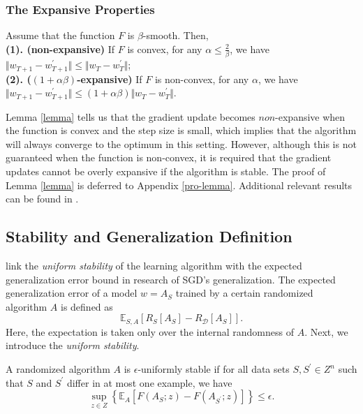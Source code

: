 \subsubsection{The Expansive Properties}
\begin{lemma}\label{lemma}
Assume that the function $F$ is $\beta$-smooth. Then, \\
{\bf (1). (non-expansive)} If $F$ is convex, for any $\alpha \leq \frac{2}{\beta}$, we have $\Vert w_{T+1}-w_{T+1}^{\prime} \Vert \leq \Vert w_{T}-w_{T}^{\prime}\Vert$; \\
{\bf (2). ($(1\!+\!\alpha\beta)$-expansive)} If $F$ is non-convex, for any $\alpha$, we have $\Vert w_{T+1}\!-\!w_{T+1}^{\prime} \Vert \!\leq\! (1\!+\!\alpha\beta)\Vert w_{T}\!-\!w_{T}^{\prime}\Vert$.
\end{lemma}

Lemma \ref{lemma} tells us that the gradient update becomes $non$-expansive when the function is convex and the step size is small, which implies that the algorithm will always converge to the optimum in this setting. However, although this is not guaranteed when the function is non-convex, it is required that the gradient updates cannot be overly expansive if the algorithm is stable. The proof of Lemma \ref{lemma} is deferred to Appendix \ref{pro-lemma}. Additional relevant results can be found in \citet{hardt2016train,xiao2022stability}. 

\subsection{Stability and Generalization Definition}
\citet{hardt2016train} link the \emph{uniform stability} of the learning algorithm with the expected generalization error bound in research of SGD's generalization. The expected generalization error of a model $w = A_S$ trained by a certain randomized algorithm $A$ is defined as 
    \begin{equation}\label{D-gen}
\mathbb{E}_{S,A}\left[R_{S}\left[A_S\right]-R_\mathcal{D}\left[A_S\right]\right]. 
    \end{equation}
Here, the expectation is taken only over the internal randomness of $A$. 
Next, we introduce the \emph{uniform stability}.

\begin{definition}
A randomized algorithm $A$ is $\epsilon$-uniformly stable if for all data sets $S, S^{\prime} \in Z^{n}$ such that $S$ and $S^{\prime}$ differ in at most one example, we have
    \begin{equation}\label{E-stab}
     \mathop{sup}\limits_{z\in Z}\left\{\mathbb{E}_{A}\left[F(A_S;z)-F(A_{S^{\prime}};z)\right] \right\} \leq \epsilon.
    \end{equation}
\end{definition}

